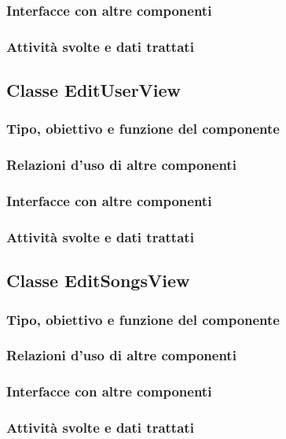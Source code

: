 \subsubsection*{Interfacce con altre componenti}
\subsubsection*{Attivit\`a svolte e dati trattati}

\subsection{Classe EditUserView}
\subsubsection*{Tipo, obiettivo e funzione del componente}
\subsubsection*{Relazioni d'uso di altre componenti}
\subsubsection*{Interfacce con altre componenti}
\subsubsection*{Attivit\`a svolte e dati trattati}

\subsection{Classe EditSongsView}
\subsubsection*{Tipo, obiettivo e funzione del componente}
\subsubsection*{Relazioni d'uso di altre componenti}
\subsubsection*{Interfacce con altre componenti}
\subsubsection*{Attivit\`a svolte e dati trattati}

